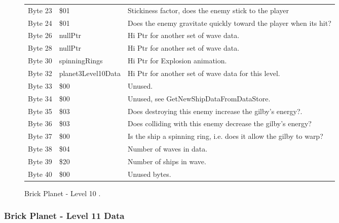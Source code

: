 \begin{figure}[H]
{\begin{adjustbox}{width=12cm}
\begin{tabular}{lll}
 Byte 23 & \$01                        & Stickiness factor, does the enemy stick to the player              \\
 Byte 24 & \$01                        & Does the enemy gravitate quickly toward the player when its hit?   \\
 Byte 26 & nullPtr                    & Hi Ptr for another set of wave data.                               \\
 Byte 28 & nullPtr                    & Hi Ptr for another set of wave data.                               \\
 Byte 30 & spinningRings              & Hi Ptr for Explosion animation.                                    \\
 Byte 32 & planet3Level10Data         & Hi Ptr for another set of wave data for this level.                \\
 Byte 33 & \$00                        & Unused.                                                            \\
 Byte 34 & \$00                        & Unused, see GetNewShipDataFromDataStore.                           \\
 Byte 35 & \$03                        & Does destroying this enemy increase the gilby's energy?.           \\
 Byte 36 & \$03                        & Does colliding with this enemy decrease the gilby's energy?        \\
 Byte 37 & \$00                        & Is the ship a spinning ring, i.e. does it allow the gilby to warp? \\
 Byte 38 & \$04                        & Number of waves in data.                                           \\
 Byte 39 & \$20                        & Number of ships in wave.                                           \\
 Byte 40 & \$00                        & Unused bytes.                                                      \\
\bottomrule
\end{tabular}

  \end{adjustbox}

  }\caption*{Brick Planet - Level 10
.}
\end{figure}

\clearpage
\subsubsection{Brick Planet - Level 11 Data}

